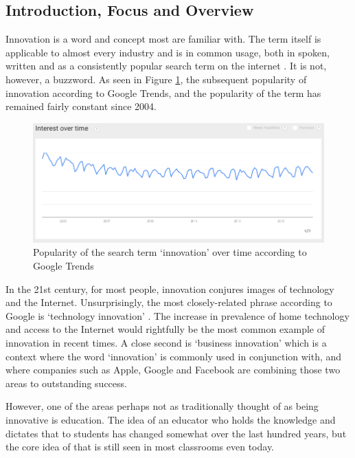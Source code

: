 \documentclass[11pt]{article}
\begin{document}
\subsection{Introduction, Focus and Overview}
Innovation is a word and concept most are familiar with. The term itself is applicable to almost every industry and is in common usage, both in spoken, written and as a consistently popular search term on the internet \citep{CorpusofContemporaryAmericanEnglish,Google}. It is not, however, a buzzword. As seen in Figure \ref{fig:popularity}, the subsequent popularity of innovation according to Google Trends, and the popularity of the term has remained fairly constant since 2004.

\begin{figure}[h]
\centering
	\captionsetup{justification=centering}
\includegraphics[scale=0.53]{figures/Innovation searches/Innovation searches_original}
\caption{Popularity of the search term `innovation' over time according to Google Trends\citep{Google}}
\label{fig:popularity} 
\end{figure}

In the 21st century, for most people, innovation conjures images of technology and the Internet. Unsurprisingly, the most closely-related phrase according to Google is `technology innovation' \citep{Google}. The increase in prevalence of home technology and access to the Internet would rightfully be the most common example of innovation in recent times. A close second is `business innovation' which is a context where the word `innovation' is commonly used in conjunction with, and where companies such as Apple, Google and Facebook are combining those two areas to outstanding success.

However, one of the areas perhaps not as traditionally thought of as being innovative is education. The idea of an educator who holds the knowledge and dictates that to students has changed somewhat over the last hundred years, but the core idea of that is still seen in most classrooms even today. 
\end{document}
